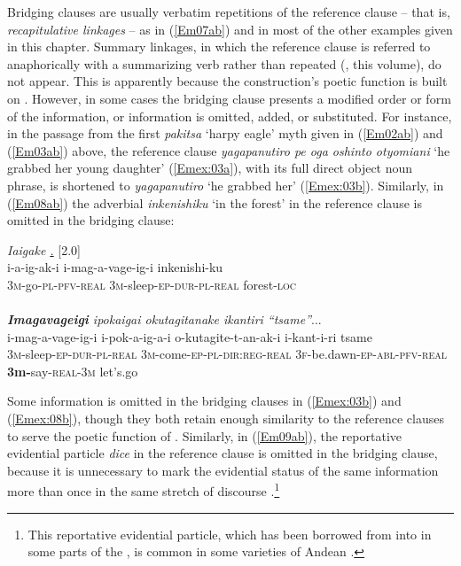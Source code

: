 \documentclass[output=paper]{LSP/langsci}
\begin{document}
 
Bridging clauses are usually verbatim repetitions of the reference clause – that is, \textit{recapitulative linkages} – as in (\ref{Em07ab}) and in most of the other examples given in this chapter. Summary linkages, in which the reference clause is referred to anaphorically with a summarizing verb rather than repeated (\citeauthor{guerin18}, this volume), do not appear. This is apparently because the construction’s poetic function is built on . However, in some cases the bridging clause presents a modified order or form of the information, or information is omitted, added, or substituted. For instance, in the passage from the first \textit{pakitsa} `harpy eagle' myth given in (\ref{Em02ab}) and (\ref{Em03ab}) above, the reference clause \textit{yagapanutiro pe oga oshinto otyomiani} `he grabbed her young daughter' (\ref{Emex:03a}), with its full direct object noun phrase, is shortened to \textit{yagapanutiro} `he grabbed her' (\ref{Emex:03b}). Similarly, in (\ref{Em08ab}) the adverbial \textit{inkenishiku} `in the forest' in the reference clause is omitted in the bridging clause:

\begin{exe}
\ex \label{Em08ab}
\begin{xlist}
\ex \label{Emex:08a}
\glt \textit{Iaigake \underline{.}} [2.0]\\
\gll i-a-ig-ak-i i-mag-a-vage-ig-i inkenishi-ku \\
 \textsc{3m-}go\textsc{-pl-pfv-real} \textsc{3m-}sleep\textsc{-ep-dur-pl-real} forest\textsc{-loc}\\
\glt {}\\
\ex \label{Emex:08b}
\glt \textit{\textbf{Imagavageigi} ipokaigai okutagitanake ikantiri ``tsame''}...\\
\gll i-mag-a-vage-ig-i i-pok-a-ig-a-i o-kutagite-t-an-ak-i i-kant-i-ri tsame\\     	      
   \textsc{3m-}sleep\textsc{-ep-dur-pl-real} \textsc{3m-}come\textsc{-ep-pl-dir:reg-real} \textsc{3f-}be.dawn\textsc{-ep-abl-pfv-real} \textbf{3m-}say\textsc{-real-3m} let’s.go\\
\glt {}
\end{xlist}
\end{exe}


%
Some information is omitted in the bridging clauses in (\ref{Emex:03b}) and (\ref{Emex:08b}), though they both retain enough similarity to the reference clauses to serve the poetic function of . Similarly, in (\ref{Em09ab}), the  reportative evidential particle \textit{dice} in the reference clause is omitted in the bridging clause, because it is unnecessary to mark the evidential status of the same information more than once in the same stretch of discourse \citep[for a similar case in , see][392]{schulze73}.\footnote{This reportative evidential particle, which has been borrowed from  into  in some parts of the , is common in some varieties of Andean  \citep[as well as its variant \textit{dizque}; see][]{babel.2009}.} 
\end{document}
